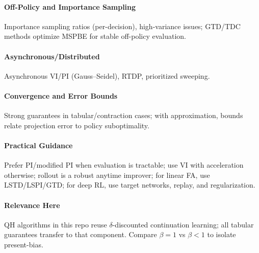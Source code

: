 \paragraph{Off-Policy and Importance Sampling}
Importance sampling ratios (per-decision), high-variance issues; GTD/TDC methods optimize MSPBE for stable off-policy evaluation.

\paragraph{Asynchronous/Distributed}
Asynchronous VI/PI (Gauss--Seidel), RTDP, prioritized sweeping.

\paragraph{Convergence and Error Bounds}
Strong guarantees in tabular/contraction cases; with approximation, bounds relate projection error to policy suboptimality.

\paragraph{Practical Guidance}
Prefer PI/modified PI when evaluation is tractable; use VI with acceleration otherwise; rollout is a robust anytime improver; for linear FA, use LSTD/LSPI/GTD; for deep RL, use target networks, replay, and regularization.

\paragraph{Relevance Here}
QH algorithms in this repo reuse $\delta$-discounted continuation learning; all tabular guarantees transfer to that component. Compare $\beta{=}1$ vs $\beta{<}1$ to isolate present-bias.
